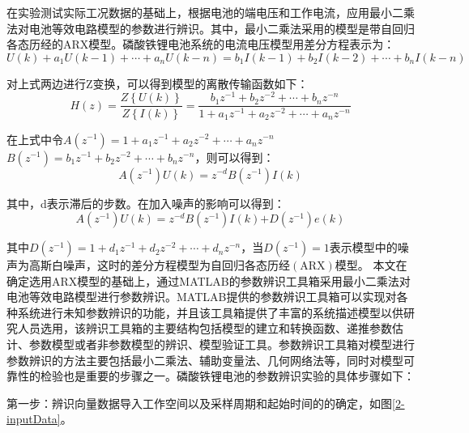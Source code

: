 在实验测试实际工况数据的基础上，根据电池的端电压和工作电流，应用最小二乘法对电池等效电路模型的参数进行辨识。其中，最小二乘法采用的模型是带自回归各态历经的ARX模型。磷酸铁锂电池系统的电流电压模型用差分方程表示为：
\begin{equation}
U\left( k \right)+{{a}_{1}}U(k-1)+\cdots +{{a}_{n}}U(k-n)={{b}_{1}}I\left( k-1 \right)+{{b}_{2}}I\left( k-2 \right)+\cdots +{{b}_{n}}I(k-n)
\end{equation}

对上式两边进行Z变换，可以得到模型的离散传输函数如下：
\begin{equation}
H\left( z \right)=\frac{Z\left\{ U\left( k \right) \right\}}{Z\left\{ I\left( k \right) \right\}}=\frac{{{b}_{1}}{{z}^{-1}}+{{b}_{2}}{{z}^{-2}}+\cdots +{{b}_{n}}{{z}^{-n}}}{1+{{a}_{1}}{{z}^{-1}}+{{a}_{2}}{{z}^{-2}}+\cdots +{{a}_{n}}{{z}^{-n}}}
\end{equation}

在上式中令$A\left( {{z}^{-1}} \right)=1+{{a}_{1}}z{}^{-1}+{{a}_{2}}{{z}^{-2}}+\cdots +{{a}_{n}}{{z}^{-n}}$~$B\left( {{z}^{-1}} \right)={{b}_{1}}{{z}^{-1}}+{{b}_{2}}{{z}^{-2}}+\cdots +{{b}_{n}}{{z}^{-n}}$，则可以得到：
\begin{equation}
A\left( {{z}^{-1}} \right)U\left( k \right)={{z}^{-d}}B\left( {{z}^{-1}} \right)I\left( k \right)
\end{equation}

其中，d表示滞后的步数。在加入噪声的影响可以得到：
\begin{equation}
A\left( {{z}^{-1}} \right)U\left( k \right)={{z}^{-d}}B\left( {{z}^{-1}} \right)I\left( k \right)\text{+}D\left( {{z}^{-1}} \right)e\left( k \right)
\end{equation}

其中$D\left( {{z}^{-1}} \right)=1+{{d}_{1}}{{z}^{-1}}+{{d}_{2}}{{z}^{-2}}+\cdots +{{d}_{n}}{{z}^{-n}}$，当$D\left( {{z}^{-1}} \right)=1$表示模型中的噪声为高斯白噪声，这时的差分方程模型为自回归各态历经$\left( \text{ARX} \right)$模型。
	本文在确定选用ARX模型的基础上，通过MATLAB的参数辨识工具箱采用最小二乘法对电池等效电路模型进行参数辨识。MATLAB提供的参数辨识工具箱可以实现对各种系统进行未知参数辨识的功能，并且该工具箱提供了丰富的系统描述模型以供研究人员选用，该辨识工具箱的主要结构包括模型的建立和转换函数、递推参数估计、参数模型或者非参数模型的辨识、模型验证工具。参数辨识工具箱对模型进行参数辨识的方法主要包括最小二乘法、辅助变量法、几何网络法等，同时对模型可靠性的检验也是重要的步骤之一。磷酸铁锂电池的参数辨识实验的具体步骤如下：

第一步：辨识向量数据导入工作空间以及采样周期和起始时间的的确定，如图\ref{2-inputData}。

